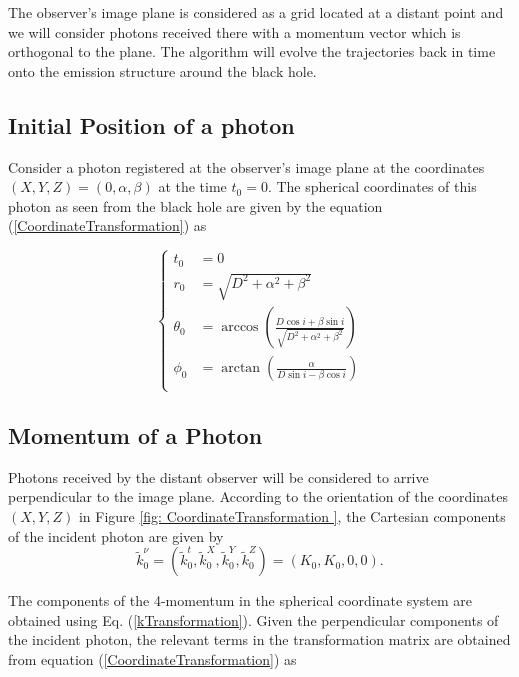The observer's image plane is considered as a grid located at a distant point and we will consider photons received there with  a momentum vector which is orthogonal to the  plane. The algorithm will evolve the trajectories back in time onto the emission structure around the black hole. 

\subsection{Initial Position of a photon}

Consider a photon registered at the observer's image plane at the coordinates $(X,Y,Z) = (0, \alpha, \beta)$ at the time $t_0 = 0$. The spherical coordinates of this photon as seen from the black hole are given by the equation (\ref{CoordinateTransformation}) as

\begin{equation}
\begin{cases}
t_0 &= 0\\
r_0 &= \sqrt{D^2 + \alpha^2 + \beta^2} \\
\theta_0 &= \arccos \left( \frac{D \cos i + \beta \sin i}{\sqrt{D^2 + \alpha^2 + \beta^2}}\right)\\
\phi_0 &= \arctan \left( \frac{\alpha}{D\sin i - \beta \cos i} \right) \\
\end{cases} 
\end{equation}

\subsection{Momentum of a Photon}

Photons received by the distant observer will be considered to arrive perpendicular to the image plane. According to the orientation of the coordinates $(X,Y,Z)$ in Figure \ref{fig: CoordinateTransformation }, the Cartesian components of the incident photon are given by
\begin{equation}
\tilde{k}^\nu_0 =\left( \tilde{k}^t_0, \tilde{k}^X_0, \tilde{k}^Y_0, \tilde{k}^Z_0 \right) = \left( K_0, K_0, 0, 0 \right).
\end{equation}

The components of the 4-momentum in the spherical coordinate system  are obtained using  Eq. (\ref{kTransformation}). Given the perpendicular components of the incident photon, the relevant terms in the transformation matrix are obtained from equation (\ref{CoordinateTransformation}) as

